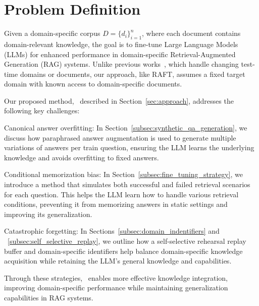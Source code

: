 \section{Problem Definition}
\label{sec:prob_def}

Given a domain-specific corpus $D = \{d_i\}_{i=1}^{n}$, where each document contains domain-relevant knowledge, the goal is to fine-tune Large Language Models (LLMs) for enhanced performance in domain-specific Retrieval-Augmented Generation (RAG) systems. Unlike previous works~\citep{linra, wanginstructretro, mecklenburg2024injecting}, which handle changing test-time domains or documents, our approach, like RAFT, assumes a fixed target domain with known access to domain-specific documents.

Our proposed method, \ourmethodshort\ described in Section~\ref{sec:approach}, addresses the following key challenges:

\begin{compactenum}[1)]

    \item Canonical answer overfitting: In Section~\ref{subsec:synthetic_qa_generation}, we discuss how paraphrased answer augmentation is used to generate multiple variations of answers per train question, ensuring the LLM learns the underlying knowledge and avoids overfitting to fixed answers.
    
	\item Conditional memorization bias: In Section~\ref{subsec:fine_tuning_strategy}, we introduce a method that simulates both successful and failed retrieval scenarios for each question. This helps the LLM learn how to handle various retrieval conditions, preventing it from memorizing answers in static settings and improving its generalization.

	
	\item Catastrophic forgetting: In Sections~\ref{subsec:domain_indentifiers} and ~\ref{subsec:self_selective_replay}, we outline how a self-selective rehearsal replay buffer and domain-specific identifiers help balance domain-specific knowledge acquisition while retaining the LLM's general knowledge and capabilities.
\end{compactenum}

Through these strategies, \ourmethodshort\ enables more effective knowledge integration, improving domain-specific performance while maintaining generalization capabilities in RAG systems.